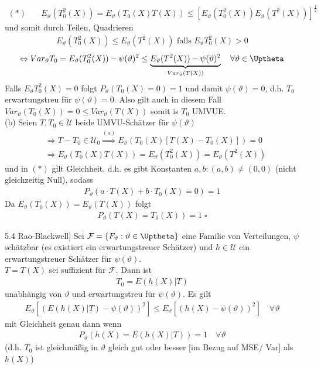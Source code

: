 \documentclass[a4paper,openany]{book}
\theoremstyle{mytheoremstyle}
\theoremstyle{mytheoremstyle2}
\newtheorem*{cbew}{Beweis}
\newenvironment{bew}[1][]{%
  \ifthenelse{\boolean{showbew}}{%
    \begin{cbew}[#1]%
  }{%
    \expandafter\comment%
  }%
}{%
  \ifthenelse{\boolean{showbew}}{%
    \end{cbew}%
  }{%
    \expandafter\endcomment%
  }%
}
\begin{document}
\begin{bew}[]
\begin{align*}
    (*)\quad &E _{\vartheta }(T_0^2(X))=E _{\vartheta }(T_0(X)T(X)) 
             \leq [E _{\vartheta }(T_0^2(X))E _{\vartheta }(T^2(X))]^{\frac{1}{2}}
  \end{align*}
  und somit durch Teilen, Quadrieren 
  \begin{align*}
    E _{\vartheta }(T_0^2(X))\leq E _{\vartheta }(T^2(X)) \text{ falls }E _{\vartheta }T_0^2(X)>0
  \end{align*}
  \begin{align*}
    \Leftrightarrow Var _{\vartheta }T_0=E _{\vartheta }(T_0^2(X))-\psi (\vartheta )^2 \leq \underbrace{E _{\vartheta }(T^2(X))-\psi (\vartheta )^2}_{Var _{\vartheta }(T(X))}\quad \forall \vartheta  \in \Uptheta
  \end{align*}
  Falls $E _{\vartheta }T_0^2(X)=0$ folgt $P _{\vartheta }(T_0(X)=0)=1$ und damit $\psi (\vartheta )=0$, d.h. $T_0$ erwartungstreu für $\psi (\vartheta )=0$. Also gilt auch in diesem Fall $Var _{\vartheta }(T_0(X)) =0\leq Var _{\vartheta }(T(X))$ somit is $T_0$ UMVUE.  \\
  (b) Seien $T,T_0 \in \mathcal{U}$ beide UMVU-Schätzer für $\psi (\vartheta )$
  \begin{align*}
    &\Rightarrow T-T_0 \in \mathcal{U}_0 \overset{(a)}\Rightarrow E _{\vartheta }(T_0(X)[T(X)-T_0(X)])=0 \\
    &\Rightarrow E _{\vartheta }(T_0(X)T(X))=E _{\vartheta }(T_0^2(X))=E _{\vartheta }(T^2(X))
  \end{align*}
   und in $(*)$ gilt Gleichheit, d.h. es gibt Konstanten $a,b:(a,b) \neq (0,0)$ (nicht gleichzeitig Null), sodass 
   \begin{align*}
    P _{\vartheta }(a \cdot T(X)+b \cdot T_0(X)=0)=1
   \end{align*}
   Da $E _{\vartheta }(T_0(X))=E _{\vartheta }(T(X))$ folgt 
   \begin{align*}
    P _{\vartheta }(T(X)=T_0(X))=1 \;\square
   \end{align*}
\end{bew}
\begin{theo}{5.4 Rao-Blackwell]}{}
  Sei $\mathcal{F}=\left\{F _{\vartheta }:\vartheta \in \Uptheta\right\}$ eine Familie von Verteilungen, $\psi $ schätzbar (es existiert ein erwartungstreuer Schätzer) und $h \in \mathcal{U}$ ein erwartungstreuer Schätzer für $\psi (\vartheta )$. \\
  $T=T(X)$ sei suffizient für $\mathcal{F}$. Dann ist
  \begin{align*}
    T_0=E(h(X)|T)
  \end{align*}
  unabhängig von $\vartheta $ und erwartungstreu für $\psi (\vartheta )$. Es gilt
  \begin{align*}
    E _{\vartheta }[(E(h(X)|T)-\psi (\vartheta ))^2] \leq E _{\vartheta }[(h(X)-\psi (\vartheta ))^2]\quad \forall \vartheta 
  \end{align*}
  mit Gleichheit genau dann wenn 
  \begin{align*}
    P _{\vartheta }(h(X)=E(h(X)|T))=1\quad \forall \vartheta 
  \end{align*}
  (d.h. $T_0$ ist gleichmäßig in $\vartheta $ gleich gut oder besser [im Bezug auf MSE/ Var] als $h(X)$)
\end{theo}
\end{document}
